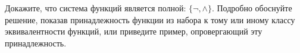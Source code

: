 \question
Докажите, что система функций является полной: $\{\neg, \wedge\}$. Подробно обоснуйте решение, показав  принадлежность функции из набора к тому или иному классу эквивалентности функций, или приведите пример, опровергающий эту принадлежность.
